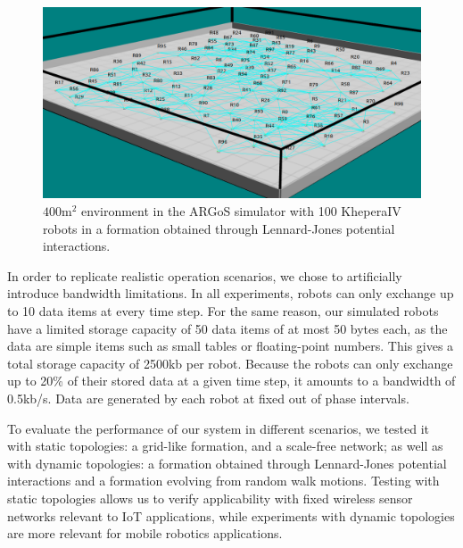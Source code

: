 \documentclass[runningheads]{llncs}
\begin{document}
\begin{figure}[h]
	\centering
    \includegraphics[width=1.0\columnwidth]{figures/argos_lennard.png}
    \caption{$400 \text{m}^2$ environment in the ARGoS simulator with 100 KheperaIV robots in a formation obtained through Lennard-Jones potential interactions.}
    \label{argos}
\end{figure}


In order to replicate realistic operation scenarios, we chose to artificially introduce bandwidth limitations. In all experiments, robots can only exchange up to 10 data items at every time step. For the same reason, our simulated robots have a limited storage capacity of 50 data items of at most 50 bytes each, as the data are simple items such as small tables or floating-point numbers. This gives a total storage capacity of 2500kb per robot. Because the robots can only exchange up to 20\% of their stored data at a given time step, it amounts to a bandwidth of 0.5kb/s. Data are generated by each robot at fixed out of phase intervals. 

To evaluate the performance of our system in different scenarios, we tested it with static topologies: a grid-like formation, and a scale-free network; as well as with dynamic topologies: a formation obtained through Lennard-Jones potential interactions and a formation evolving from random walk motions. Testing with static topologies allows us to verify applicability with fixed wireless sensor networks relevant to IoT applications, while experiments with dynamic topologies are more relevant for mobile robotics applications.
\end{document}
